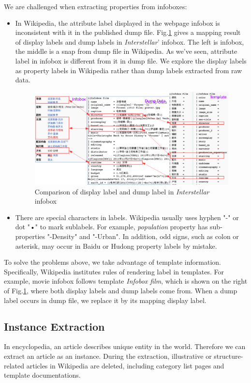 \documentclass[runningheads,a4paper]{llncs}
\begin{document}
\begin{CJK*}{UTF8}{song}
We are challenged when extracting properties from infoboxes:
\begin{itemize}
    \item In Wikipedia, the attribute label displayed in the webpage infobox is inconsistent with it in the published dump file. Fig.\ref{fig:infobox-template} gives a mapping result of display labels and dump labels in \emph{Interstellar}' infobox. The left is infobox, the middle is a snap from dump file in Wikipedia. As we've seen, attribute label in infobox is different from it in dump file. We explore the display labels as property labels in Wikipedia rather than dump labels extracted from raw data.
    \begin{figure}[ht]
        \centerline{\includegraphics[width=1\columnwidth]{fig/infobox-template}}
        \caption{Comparison of display label and dump label in \emph{Interstellar} infobox}
        \label{fig:infobox-template}
    \end{figure}%
\item There are special characters in labels. Wikipedia usually uses hyphen "-" or dot "•" to mark sublabels. For example, \emph{population} property has sub-properties "-Density" and "-Urban". In addition, odd signs, such as colon or asterisk, may occur in Baidu or Hudong property labels by mistake.
\end{itemize}

To solve the problems above, we take advantage of template information. Specifically, Wikipedia institutes rules of rendering label in templates. For example, movie infobox follows template \emph{Infobox film}, which is shown on the right of Fig.\ref{fig:infobox-template}, where both display labels and dump labels come from. When a dump label occurs in dump file, we replace it by its mapping display label.

\subsection{Instance Extraction}
\label{sec:ie}
In encyclopedia, an article describes unique entity in the world. Therefore we can extract an article as an instance. During the extraction, illustrative or structure-related articles in Wikipedia are deleted, including category list pages and template documentations.


\end{CJK*}
\end{document}
